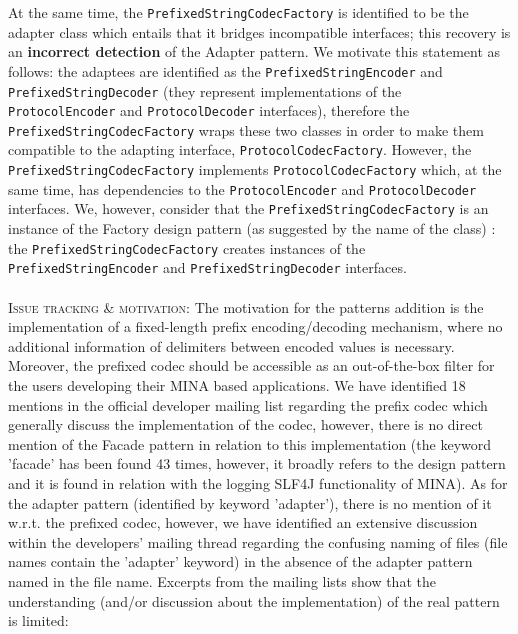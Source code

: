At the same time, the \texttt{PrefixedStringCodecFactory} is identified to be the adapter class which entails that it bridges incompatible interfaces; this recovery is an \textbf{incorrect detection} of the Adapter pattern. We motivate this statement as follows: the adaptees are identified as the \texttt{PrefixedStringEncoder} and \texttt{PrefixedStringDecoder} (they represent implementations of the \texttt{ProtocolEncoder} and \texttt{ProtocolDecoder} interfaces), therefore the \texttt{PrefixedStringCodecFactory} wraps these two classes in order to make them compatible to the adapting interface, \texttt{ProtocolCodecFactory}. However, the \texttt{PrefixedStringCodecFactory} implements \texttt{ProtocolCodecFactory} which, at the same time, has dependencies to the \texttt{ProtocolEncoder} and \texttt{ProtocolDecoder} interfaces. We, however, consider that the \texttt{PrefixedStringCodecFactory} is an instance of the Factory design pattern (as suggested by the name of the class) \cite{factory}: the \texttt{PrefixedStringCodecFactory} creates instances of the \texttt{PrefixedStringEncoder} and \texttt{PrefixedStringDecoder} interfaces.    \\\\
\textsc{Issue tracking \& motivation}: The motivation for the patterns addition is the implementation of a fixed-length prefix encoding/decoding mechanism, where no additional information of delimiters between encoded values is necessary. Moreover, the prefixed codec should be accessible as an out-of-the-box filter for the users developing their MINA based applications. We have identified 18 mentions in the official developer mailing list \cite{mina-mail} regarding the prefix codec which generally discuss the implementation of the codec, however, there is no direct mention of the Facade pattern in relation to this implementation (the keyword 'facade' has been found 43 times, however, it broadly refers to the design pattern and it is found in relation with the logging SLF4J \cite{slf4j} functionality of MINA). As for the adapter pattern (identified by keyword 'adapter'), there is no mention of it w.r.t. the prefixed codec, however, we have identified an extensive discussion within the developers' mailing thread regarding the confusing naming of files (file names contain the 'adapter' keyword) in the absence of the adapter pattern named in the file name. Excerpts from the mailing lists show that the understanding (and/or discussion about the implementation) of the real pattern is limited: \\\\
